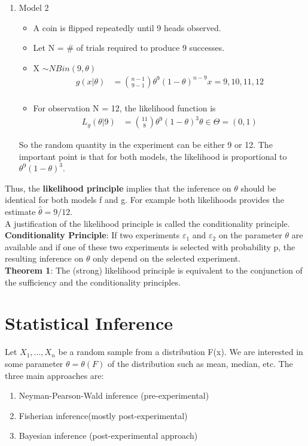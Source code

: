 \documentclass[12pt, oneside]{article}
\newcommand*{\eps}{\varepsilon}
\newcommand*{\htheta}{\widehat{\theta}}
\begin{document}
\begin{itemize}
\begin{enumerate}
    \item Model 2
    \begin{itemize}
        \item A coin is flipped repeatedly until 9 heads observed.
        \item Let N = \# of trials required to produce 9 successes.
        \item X $\sim NBin(9, \theta)$
        \begin{align*}
            g(x|\theta) &= \binom{n-1}{9-1} \theta^9 (1-\theta)^{n-9} x = 9,10,11,12 \\
        \end{align*}
        \item For observation N = 12, the likelihood function is 
        \begin{align*}
            L_g(\theta|9) &=\binom{11}{8} \theta^9 (1-\theta)^{3} \theta \in \Theta = (0,1)
        \end{align*}
    \end{itemize}
     
     So the random quantity in the experiment can be either 9 or 12. The important point is that for both models, the likelihood is proportional to $\theta^9(1-\theta)^3$.
 \end{enumerate}
      
Thus, the \textbf{likelihood principle} implies that the inference on $\theta$ should be identical for both models f and g. For example both likelihoods provides the estimate $\htheta = 9/12$.\\

A justification of the likelihood principle is called the conditionality principle.\\
 
 \textbf{Conditionality Principle}: If two experiments $\eps_1$ and $\eps_2$ on the parameter $\theta$ are available and if one of these two experiments is selected with probability p, the resulting inference on $\theta$ only depend on the selected experiment. \\
 
 \textbf{Theorem 1}: The (strong) likelihood principle is equivalent to the conjunction of the sufficiency and the conditionality principles.
 
 \section{Statistical Inference}
 Let $X_1,...,X_n$ be a random sample from a distribution F(x). We are interested in some parameter $\theta = \theta(F)$ of the distribution such as mean, median, etc. 
 The three main approaches are:
 \begin{enumerate}
    \item Neyman-Pearson-Wald inference (pre-experimental)
    \item Fisherian inference(mostly post-experimental)
    \item Bayesian inference (post-experimental approach)
 \end{enumerate}
 

\end{itemize}
\end{document}
